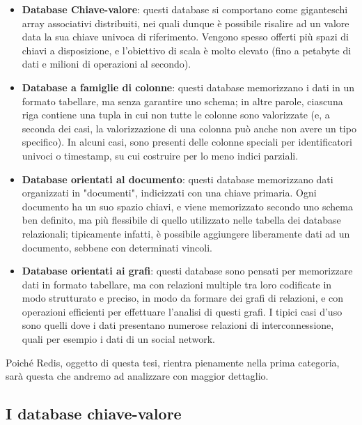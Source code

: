 \begin{itemize}
	\medskip
	\item
	\textbf{Database Chiave-valore}: questi database si comportano come giganteschi array
	associativi distribuiti, nei quali dunque è possibile risalire ad un valore data la
	sua chiave univoca di riferimento. Vengono spesso offerti più spazi di chiavi
	a disposizione, e l'obiettivo di scala è molto elevato (fino a petabyte di dati
	e milioni di operazioni al secondo).

	\item
	\textbf{Database a famiglie di colonne}: questi database memorizzano i dati in un formato
	tabellare, ma senza garantire uno schema; in altre parole, ciascuna riga contiene
	una tupla in cui non tutte le colonne sono valorizzate (e, a seconda dei casi, la
	valorizzazione di una colonna può anche non avere un tipo specifico). In alcuni
	casi, sono presenti delle colonne speciali per identificatori univoci o timestamp,
	su cui costruire per lo meno indici parziali.

	\item
	\textbf{Database orientati al documento}: questi database memorizzano dati organizzati in
	"documenti", indicizzati con una chiave primaria. Ogni documento ha un suo spazio
	chiavi, e viene memorizzato secondo uno schema ben definito, ma più flessibile
	di quello utilizzato nelle tabella dei database relazionali; tipicamente infatti,
	è possibile aggiungere liberamente dati ad un documento, sebbene con determinati
	vincoli.

	\item
	\textbf{Database orientati ai grafi}: questi database sono pensati per memorizzare dati
	in formato tabellare, ma con relazioni multiple tra loro codificate in modo
	strutturato e preciso, in modo da formare dei grafi di relazioni, e con operazioni
	efficienti per effettuare l'analisi di questi grafi. I tipici casi d'uso sono
	quelli dove i dati presentano numerose relazioni di interconnessione, quali per
	esempio i dati di un social network.
\end{itemize}

Poiché Redis, oggetto di questa tesi, rientra pienamente nella prima categoria, sarà
questa che andremo ad analizzare con maggior dettaglio.


\subsection{I database chiave-valore}

